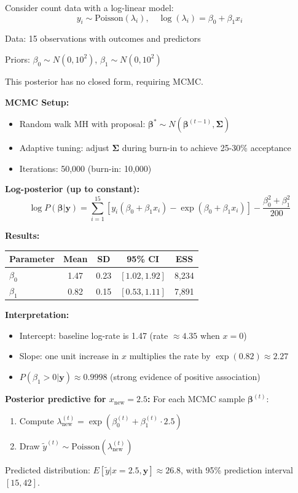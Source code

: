 \begin{examplebox}
\begin{example}
Consider count data with a log-linear model:
$$y_i \sim \text{Poisson}(\lambda_i), \quad \log(\lambda_i) = \beta_0 + \beta_1 x_i$$

Data: 15 observations with outcomes and predictors

Priors: $\beta_0 \sim N(0, 10^2)$, $\beta_1 \sim N(0, 10^2)$

This posterior has no closed form, requiring MCMC.

\textbf{MCMC Setup:}
\begin{itemize}
\item Random walk MH with proposal: $\boldsymbol{\beta}^* \sim N(\boldsymbol{\beta}^{(t-1)}, \boldsymbol{\Sigma})$
\item Adaptive tuning: adjust $\boldsymbol{\Sigma}$ during burn-in to achieve 25-30\% acceptance
\item Iterations: 50,000 (burn-in: 10,000)
\end{itemize}

\textbf{Log-posterior (up to constant):}
$$\log P(\boldsymbol{\beta}|\mathbf{y}) = \sum_{i=1}^{15}\left[y_i(\beta_0 + \beta_1 x_i) - \exp(\beta_0 + \beta_1 x_i)\right] - \frac{\beta_0^2 + \beta_1^2}{200}$$

\textbf{Results:}
\begin{center}
\begin{tabular}{lcccc}
\toprule
Parameter & Mean & SD & 95\% CI & ESS \\
\midrule
$\beta_0$ & 1.47 & 0.23 & $[1.02, 1.92]$ & 8,234 \\
$\beta_1$ & 0.82 & 0.15 & $[0.53, 1.11]$ & 7,891 \\
\bottomrule
\end{tabular}
\end{center}
\textbf{Interpretation:}
\begin{itemize}
\item Intercept: baseline log-rate is 1.47 (rate $\approx 4.35$ when $x=0$)
\item Slope: one unit increase in $x$ multiplies the rate by $\exp(0.82) \approx 2.27$
\item $P(\beta_1 > 0|\mathbf{y}) \approx 0.9998$ (strong evidence of positive association)
\end{itemize}
\textbf{Posterior predictive for $x_{\text{new}} = 2.5$:}
For each MCMC sample $\boldsymbol{\beta}^{(t)}$:
\begin{enumerate}
\item Compute $\lambda^{(t)}_{\text{new}} = \exp(\beta_0^{(t)} + \beta_1^{(t)} \cdot 2.5)$
\item Draw $\tilde{y}^{(t)} \sim \text{Poisson}(\lambda^{(t)}_{\text{new}})$
\end{enumerate}
Predicted distribution: $E[\tilde{y}|x=2.5, \mathbf{y}] \approx 26.8$, with 95\% prediction interval $[15, 42]$.
\end{example}
\end{examplebox}


